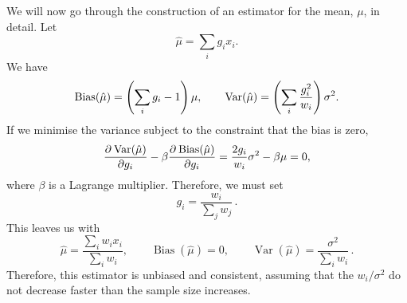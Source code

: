 \documentclass[12pt]{article}
\DeclareMathOperator{\bias}{Bias}
\DeclareMathOperator{\var}{Var}
\newcommand{\mh}{\hat\mu}
\begin{document}
We will now go through the construction of an estimator for the mean, $\mu$, in detail. Let
%
\begin{equation}\label{eq:estmeangen}
  \mh = \sum_i g_i x_i.
\end{equation}
%
We have
%
\begin{equation}\label{eq:estmeanbias}
  \bias(\mh) = \prn{\sum_i g_i -1} \mu, \qquad
  \var(\mh) = \prn{\sum_i \frac{g_i^2}{w_i}} \sigma^2.
\end{equation}
%
If we minimise the variance subject to the constraint that the bias is zero,
%
\begin{equation}\label{eq:minvarmean}
  \pdiff{\var(\mh)}{g_i} - \beta \pdiff{\bias(\mh)}{g_i} = \frac{2g_i}{w_i}\sigma^2 - \beta\mu = 0,
\end{equation}
%
where $\beta$ is a Lagrange multiplier. Therefore, we must set
%
\begin{equation}\label{eq:meanweights}
  g_i = \frac{w_i}{\sum_j w_j}\,.
\end{equation}
%
This leaves us with
%
\begin{equation}\label{eq:meanest}
  \mh = \frac{\sum_i w_i x_i}{\sum_i w_i}, \qquad
  \bias(\mh) = 0, \qquad
  \var(\mh) = \frac{\sigma^2}{\sum_i w_i}\,.
\end{equation}
%
Therefore, this estimator is unbiased and consistent, assuming that the $w_i/\sigma^2$ do not decrease faster than the sample size increases.
\end{document}
